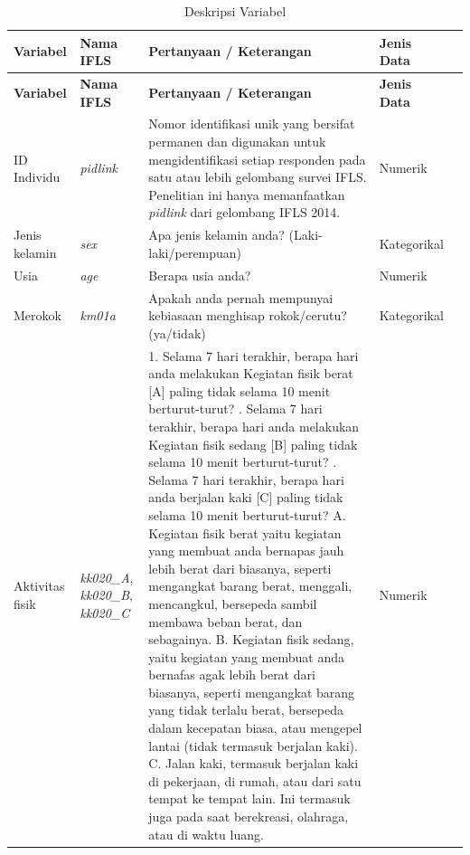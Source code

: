 \begin{longtable}{|p{2.5cm}|p{3cm}|p{3.5cm}|p{5.5cm}|p{2cm}|}
\caption{Deskripsi Variabel}\label{tab:deskripsi-variabel} \\
\hline
\textbf{Variabel} & \textbf{Nama IFLS} & \textbf{Pertanyaan / Keterangan} & \textbf{Jenis Data} \\
\hline
\endfirsthead

\hline
\textbf{Variabel} & \textbf{Nama IFLS} & \textbf{Pertanyaan / Keterangan} & \textbf{Jenis Data} \\
\hline
\endhead

\hline
\endfoot

\hline
\endlastfoot

ID Individu & \textit{pidlink} & Nomor identifikasi unik yang bersifat permanen dan digunakan untuk mengidentifikasi setiap responden pada satu atau lebih gelombang survei IFLS. Penelitian ini hanya memanfaatkan \textit{pidlink} dari gelombang IFLS 2014. & Numerik \\ \hline

Jenis kelamin & \textit{sex} & Apa jenis kelamin anda? (Laki-laki/perempuan) & Kategorikal \\ \hline

Usia & \textit{age} & Berapa usia anda? & Numerik \\ \hline

Merokok & \textit{km01a} & Apakah anda pernah mempunyai kebiasaan menghisap rokok/cerutu? (ya/tidak) & Kategorikal \\ \hline

Aktivitas fisik & \textit{kk020\_A}, \textit{kk020\_B}, \textit{kk020\_C} & 1. Selama 7 hari terakhir, berapa hari anda melakukan Kegiatan fisik berat [A] paling tidak selama 10 menit berturut-turut? \newline 2. Selama 7 hari terakhir, berapa hari anda melakukan Kegiatan fisik sedang [B] paling tidak selama 10 menit berturut-turut? \newline 3. Selama 7 hari terakhir, berapa hari anda berjalan kaki [C] paling tidak selama 10 menit berturut-turut? \newline A. Kegiatan fisik berat yaitu kegiatan yang membuat anda bernapas jauh lebih berat dari biasanya, seperti mengangkat barang berat, menggali, mencangkul, bersepeda sambil membawa beban berat, dan sebagainya. \newline B. Kegiatan fisik sedang, yaitu kegiatan yang membuat anda bernafas agak lebih berat dari biasanya, seperti mengangkat barang yang tidak terlalu berat, bersepeda dalam kecepatan biasa, atau mengepel lantai (tidak termasuk berjalan kaki). \newline C. Jalan kaki, termasuk berjalan kaki di pekerjaan, di rumah, atau dari satu tempat ke tempat lain. Ini termasuk juga pada saat berekreasi, olahraga, atau di waktu luang. & Numerik \\ \hline


\end{longtable}
